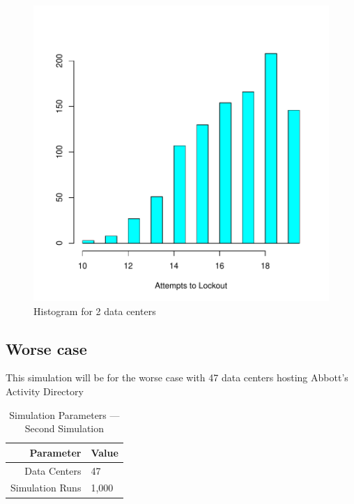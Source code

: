 \documentclass[11pt, letterpaper]{article}
\begin{document}
\begin{figure}[H]
\centering
\includegraphics{Report-003}
	\caption{Histogram for 2 data centers}
	\label{fig:hist_1}
\end{figure}

\subsection{Worse case}
This simulation will be for the worse case with 47 data centers hosting Abbott's
Activity Directory

\begin{table}[H]
	\centering
	\caption{Simulation Parameters --- Second Simulation}
	\begin{tabular}{||r|l||}
		\hline \hline
		Parameter & Value \\ \hline \hline
		Data Centers & 47 \\ \hline
		Simulation Runs & 1,000 \\ \hline \hline
	\end{tabular}
	\label{tab:Sim2_set}
\end{table}
\end{document}
